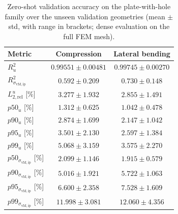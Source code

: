 \begin{table}[t]
\centering
\caption{Zero-shot validation accuracy on the plate-with-hole family over the unseen validation geometries (mean $\pm$ std, with range in brackets; dense evaluation on the full FEM mesh).}
\label{tab:plate_val_metrics}
\small
\begin{tabular}{lcc}
\toprule
Metric & Compression & Lateral bending \\
\midrule
$R^2_u$
& $0.99551 \pm 0.00481$ \; [$0.98507,\,0.99952$]
& $0.99745 \pm 0.00270$ \; [$0.99145,\,0.99969$] \\
$R^2_{\sigma_{\mathrm{vM,ip}}}$
& $0.592 \pm 0.209$ \; [$0.261,\,0.915$]
& $0.730 \pm 0.148$ \; [$0.446,\,0.918$] \\
$L_{2,\mathrm{rel}}^u$ [\%]
& $3.277 \pm 1.932$ \; [$1.265,\,7.127$]
& $2.855 \pm 1.491$ \; [$1.162,\,5.784$] \\
$p50_u$ [\%]
& $1.312 \pm 0.625$ \; [$0.598,\,2.461$]
& $1.042 \pm 0.478$ \; [$0.484,\,1.959$] \\
$p90_u$ [\%]
& $2.874 \pm 1.699$ \; [$1.136,\,6.129$]
& $2.147 \pm 1.042$ \; [$0.913,\,4.024$] \\
$p95_u$ [\%]
& $3.501 \pm 2.130$ \; [$1.336,\,7.179$]
& $2.597 \pm 1.384$ \; [$1.060,\,5.300$] \\
$p99_u$ [\%]
& $5.068 \pm 3.159$ \; [$1.762,\,10.401$]
& $3.575 \pm 2.270$ \; [$1.397,\,8.195$] \\
$p50_{\sigma_{\mathrm{vM,ip}}}$ [\%]
& $2.099 \pm 1.146$ \; [$1.083,\,5.869$]
& $1.915 \pm 0.579$ \; [$1.143,\,3.560$] \\
$p90_{\sigma_{\mathrm{vM,ip}}}$ [\%]
& $5.016 \pm 1.921$ \; [$3.409,\,11.131$]
& $5.722 \pm 1.063$ \; [$4.204,\,7.968$] \\
$p95_{\sigma_{\mathrm{vM,ip}}}$ [\%]
& $6.600 \pm 2.358$ \; [$4.593,\,14.275$]
& $7.528 \pm 1.609$ \; [$5.879,\,12.185$] \\
$p99_{\sigma_{\mathrm{vM,ip}}}$ [\%]
& $11.998 \pm 3.081$ \; [$9.821,\,21.948$]
& $12.060 \pm 4.356$ \; [$8.713,\,24.332$] \\
\bottomrule
\end{tabular}
\end{table}
